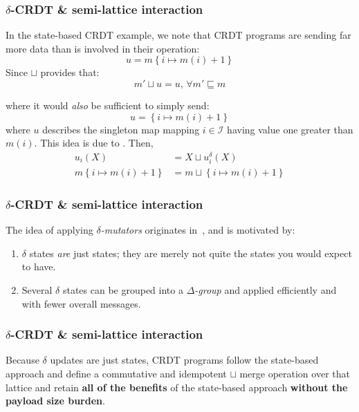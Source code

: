\documentclass[aspectratio=169,compress]{beamer}
\begin{document}
  \begin{frame}
    \frametitle{$\delta$-CRDT \& semi-lattice interaction}

    In the state-based CRDT example, we note that CRDT programs are sending far
    more data than is involved in their operation:
    \[
      u = m\left\{ i \mapsto m(i) + 1 \right\}
    \]
    Since $\sqcup$ provides that:
    \[
      m' \sqcup u = u,\, \forall m' \sqsubseteq m
    \]

    \pause
    where it would \textit{also} be sufficient to simply send:
    \[
      u = \left\{ i \mapsto m(i) + 1 \right\}
    \]
    where $u$ describes the singleton map mapping $i \in \mathcal{I}$ having
    value one greater than $m(i)$. This idea is due to \cite{almeida16}. Then,
    \[
      \begin{aligned}
        u_i(X) &= X \sqcup u_i^\delta(X) \\
        m\left\{ i \mapsto m(i) + 1 \right\} &= m \sqcup \left\{ i \mapsto m(i) + 1 \right\}
      \end{aligned}
    \]
  \end{frame}

  \begin{frame}
    \frametitle{$\delta$-CRDT \& semi-lattice interaction}

    The idea of applying \textit{$\delta$-mutators} originates
    in~\cite{almeida16}, and is motivated by:
    \begin{enumerate}
      \item $\delta$ states \textit{are} just states; they are merely not quite
        the states you would expect to have.
      \item Several $\delta$ states can be grouped into a
        \textit{$\Delta$-group} and applied efficiently and with fewer overall
        messages.
    \end{enumerate}
  \end{frame}

  \begin{frame}
    \frametitle{$\delta$-CRDT \& semi-lattice interaction}

    Because $\delta$ updates are just states, CRDT programs follow the
    state-based approach and define a commutative and idempotent $\sqcup$ merge
    operation over that lattice and retain \textbf{all of the benefits} of
    the state-based approach \textbf{without the payload size burden}.
  \end{frame}
\end{document}
